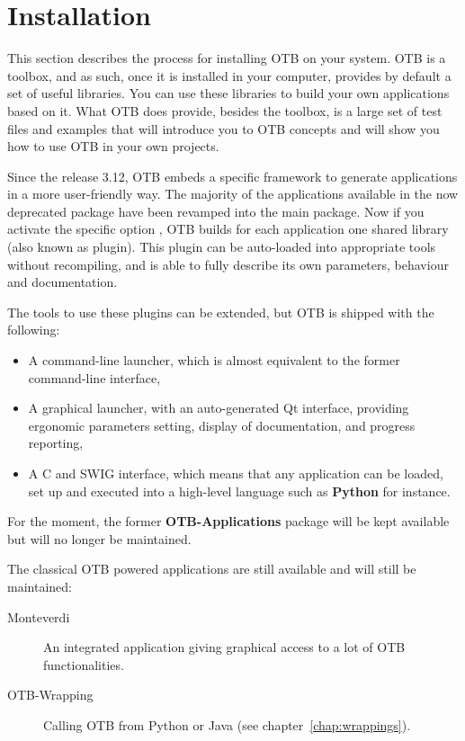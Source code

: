 \chapter{Installation}
\label{chapter:Installation}

This section describes the process for installing OTB on your system. 
OTB is a toolbox, and as such, once it is installed in your computer, provides by default a set of useful libraries. You can use
these libraries to build your own applications based on it. What OTB does provide, besides the toolbox, is a
large set of test files and examples that will introduce you to OTB concepts
and will show you how to use OTB in your own projects. 

Since the release 3.12, OTB embeds a specific framework to generate applications
in a more user-friendly way. The majority of the applications available in the
now deprecated  package have been revamped into the main  package. Now if you 
activate the specific option , OTB builds for each 
application one shared library (also known as plugin). This plugin can be
auto-loaded into appropriate tools without recompiling, and is able to
fully describe its own parameters, behaviour and documentation.

The tools to use these plugins can be extended, but OTB is shipped with the
following:
\begin{itemize}
\item A command-line launcher, which is almost equivalent to the former
   command-line interface,
\item A graphical launcher, with an auto-generated Qt interface,
  providing ergonomic parameters setting, display of documentation,
  and progress reporting,
\item A C and SWIG interface, which means that any application can be
  loaded, set up and executed into a high-level language such as \textbf{Python}
  for instance.
\end{itemize}  

For the moment, the former \textbf{OTB-Applications} package will be kept available 
but will no longer be maintained.

The classical OTB powered applications are still available and will still be maintained:
\begin{description}
\item [Monteverdi]{An integrated application giving graphical access to a lot of OTB 
functionalities.}
\item[OTB-Wrapping]{Calling OTB from Python or Java (see chapter~\ref{chap:wrappings}).}
\end{description}

